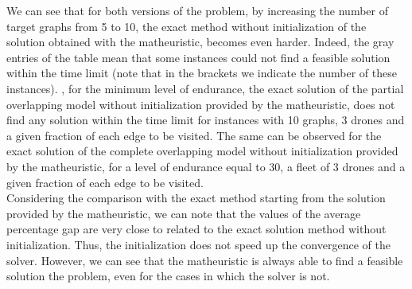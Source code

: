 We can see that for both versions of the problem, by increasing the number of target graphs from 5 to 10, the exact method without initialization of the solution obtained with the matheuristic, becomes even harder. Indeed, the gray entries of the table mean that some instances could not find a feasible solution within the time limit (note that in the brackets we indicate the number of these instances). %
, for the minimum level of endurance, the exact solution of the partial overlapping model without initialization provided by the matheuristic, does not find any solution within the time limit for instances with 10 graphs, 3 drones and a given fraction of each edge to be visited. The same can  be observed for the exact solution of the complete overlapping model without initialization provided by the matheuristic, for a level of endurance equal to 30, a fleet of 3 drones and a given fraction of each edge to be visited.\\
Considering the comparison with the exact method starting from the solution provided by the matheuristic, we can note that the values of the average percentage gap are very close to  related to the exact solution method without initialization. Thus, the initialization does not speed up the convergence of the solver. However, we can see that the matheuristic is always able to find a feasible solution  the problem, even for the cases in which the solver is not. 

